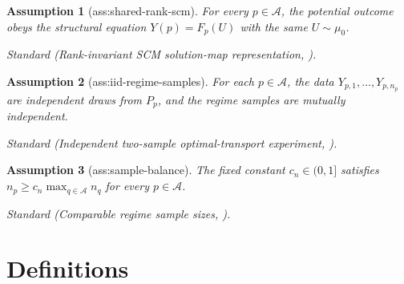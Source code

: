 \documentclass{article}
\newtheorem{assumption}{Assumption}
\begin{document}
\begin{assumption}[ass:shared-rank-scm]\label{ass:shared-rank-scm}
For every \(p\in\mathcal A\), the potential outcome obeys the structural equation \(Y(p)=F_p(U)\) with the same \(U\sim\mu_0\).
\par\smallskip\noindent\emph{Standard} (Rank-invariant SCM solution-map representation, \cite{deLaraGanassali2025GoodMatching}).
\end{assumption}

\begin{assumption}[ass:iid-regime-samples]\label{ass:iid-regime-samples}
For each \(p\in\mathcal A\), the data \(Y_{p,1},\ldots,Y_{p,n_p}\) are independent draws from \(P_p\), and the regime samples are mutually independent.
\par\smallskip\noindent\emph{Standard} (Independent two-sample optimal-transport experiment, \cite{ManoleBalakrishnanNilesWeedWasserman2023CLT}).
\end{assumption}

\begin{assumption}[ass:sample-balance]\label{ass:sample-balance}
The fixed constant \(c_n\in(0,1]\) satisfies \(n_p\ge c_n\max_{q\in\mathcal A}n_q\) for every \(p\in\mathcal A\).
\par\smallskip\noindent\emph{Standard} (Comparable regime sample sizes, \cite{ManoleBalakrishnanNilesWeedWasserman2024Plugin}).
\end{assumption}

\section{Definitions}
\end{document}
